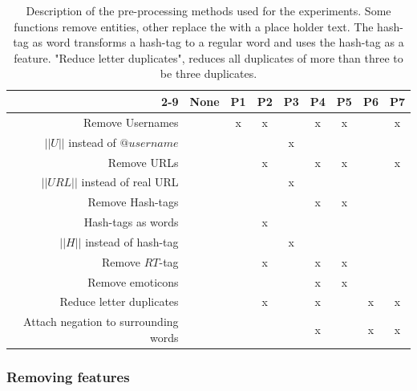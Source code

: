 \begin{table}[htb]
	\centering
	\begin{tabular}{|r||c|c|c|c|c|c|c|c|}

		\cline{2-9}
	 \multicolumn{1}{c| }{ } & \textbf{None} & \textbf{P1} & \textbf{P2} & \textbf{P3} & \textbf{P4} & \textbf{P5} & \textbf{P6} & \textbf{P7}  \\ \hline
		Remove Usernames                     & & x & x &   & x & x & & x \\ \hline
		$||U||$ instead of $@username$       & &   &   & x &   &   & & \\ \hline
		Remove URLs                          & &   & x &   & x & x & & x \\ \hline
		$||URL||$ instead of real URL        & &   &   & x &   &   & & \\ \hline
		Remove Hash-tags                     & &   &   &   & x & x & & \\ \hline
		Hash-tags as words                   & &   & x &   &   &   & & \\ \hline
		$||H||$ instead of hash-tag          & &   &   & x &   &   & & \\ \hline
		Remove $RT$-tag                      & &   & x &   & x & x & & \\ \hline
		Remove emoticons                     & &   &   &   & x & x & & \\ \hline
		Reduce letter duplicates             & &   & x &   & x &   & x & x \\ \hline
		Attach negation to surrounding words & &   &   &   & x &   & x & x \\ \hline
	\end{tabular}
	\caption[Description of used pre-processing methods]{Description of the pre-processing methods used for the experiments. Some functions remove entities, other replace the with a place holder text. The hash-tag as word transforms a hash-tag to a regular word and uses the hash-tag as a feature. "Reduce letter duplicates", reduces all duplicates of more than three to be three duplicates.}
	\label{tab:preproc_desc}
\end{table}

\subsubsection{Removing features}

